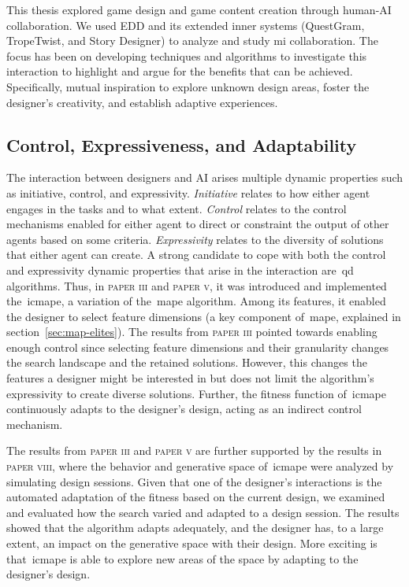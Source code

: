 This thesis explored game design and game content creation through human-AI collaboration. We used EDD and its extended inner systems (QuestGram, TropeTwist, and Story Designer) to analyze and study \acrshort{mi} collaboration. The focus has been on developing techniques and algorithms to investigate this interaction to highlight and argue for the benefits that can be achieved. Specifically, mutual inspiration to explore unknown design areas, foster the designer's creativity, and establish adaptive experiences.

\subsection{Control, Expressiveness, and Adaptability}

The interaction between designers and AI arises multiple dynamic properties such as initiative, control, and expressivity. \emph{Initiative} relates to how either agent engages in the tasks and to what extent. \emph{Control} relates to the control mechanisms enabled for either agent to direct or constraint the output of other agents based on some criteria. \emph{Expressivity} relates to the diversity of solutions that either agent can create. A strong candidate to cope with both the control and expressivity dynamic properties that arise in the interaction are~\acrshort{qd} algorithms. Thus, in \textsc{paper iii} and \textsc{paper v}, it was introduced and implemented the~\acrlong{icmape}, a variation of the~\acrshort{mape} algorithm. Among its features, it enabled the designer to select feature dimensions (a key component of~\acrshort{mape}, explained in section~\ref{sec:map-elites}). The results from \textsc{paper iii} pointed towards enabling enough control since selecting feature dimensions and their granularity changes the search landscape and the retained solutions. However, this changes the features a designer might be interested in but does not limit the algorithm's expressivity to create diverse solutions. Further, the fitness function of~\acrshort{icmape} continuously adapts to the designer's design, acting as an indirect control mechanism.

The results from \textsc{paper iii} and \textsc{paper v} are further supported by the results in \textsc{paper viii}, where the behavior and generative space of~\acrshort{icmape} were analyzed by simulating design sessions. Given that one of the designer's interactions is the automated adaptation of the fitness based on the current design, we examined and evaluated how the search varied and adapted to a design session. The results showed that the algorithm adapts adequately, and the designer has, to a large extent, an impact on the generative space with their design. More exciting is that~\acrshort{icmape} is able to explore new areas of the space by adapting to the designer's design.

